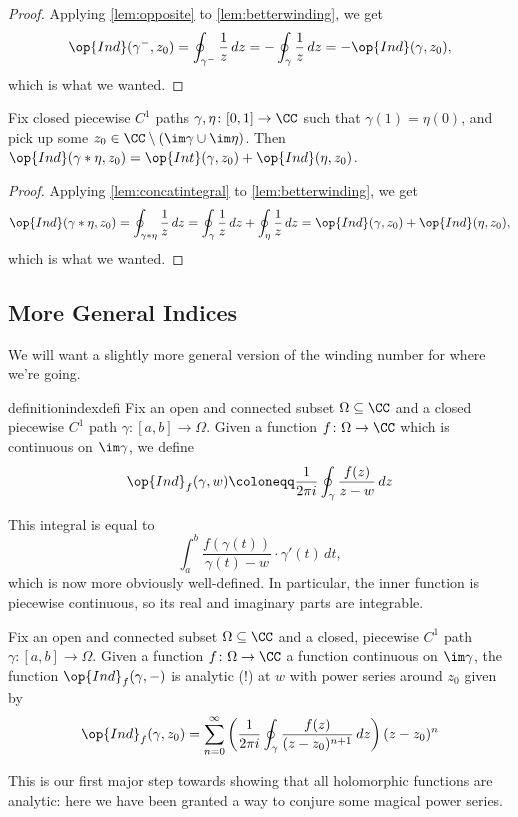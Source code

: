 \documentclass[../notes.tex]{subfiles}
\begin{document}
\begin{proof}
	Applying \autoref{lem:opposite} to \autoref{lem:betterwinding}, we get
	\[\op{Ind}(\gamma^-,z_0)=\oint_{\gamma^-}\frac1z\,dz=-\oint_\gamma\frac1z\,dz=-\op{Ind}(\gamma,z_0),\]
	which is what we wanted.
\end{proof}
\begin{corollary}
	Fix closed piecewise $C^1$ paths $\gamma,\eta\colon [0,1]\to\CC$ such that $\gamma(1)=\eta(0)$, and pick up some $z_0\in\CC\setminus(\im\gamma\cup\im\eta)$. Then $\op{Ind}(\gamma*\eta,z_0)=\op{Int}(\gamma,z_0)+\op{Ind}(\eta,z_0)$.
\end{corollary}
\begin{proof}
	Applying \autoref{lem:concatintegral} to \autoref{lem:betterwinding}, we get
	\[\op{Ind}(\gamma*\eta,z_0)=\oint_{\gamma*\eta}\frac1z\,dz=\oint_\gamma\frac1z\,dz+\oint_\eta\frac1z\,dz=\op{Ind}(\gamma,z_0)+\op{Ind}(\eta,z_0),\]
	which is what we wanted.
\end{proof}

\subsection{More General Indices}
We will want a slightly more general version of the winding number for where we're going.
\begin{restatable}[Index]{definition}{indexdefi}
	Fix an open and connected subset $\Omega\subseteq\CC$ and a closed piecewise $C^1$ path $\gamma\colon [a,b]\to\Omega$. Given a function $f\colon \Omega\to\CC$ which is continuous on $\im\gamma$, we define
	\[\op{Ind}_f(\gamma,w)\coloneqq \frac1{2\pi i}\oint_\gamma\frac{f(z)}{z-w}\,dz\]
\end{restatable}
\begin{remark}
	This integral is equal to
	\[\int_a^b\frac{f(\gamma(t))}{\gamma(t)-w}\cdot\gamma'(t)\,dt,\]
	which is now more obviously well-defined. In particular, the inner function is piecewise continuous, so its real and imaginary parts are integrable.
\end{remark}
\begin{proposition} \label{prop:indexanalytic}
	Fix an open and connected subset $\Omega\subseteq\CC$ and a closed, piecewise $C^1$ path $\gamma\colon [a,b]\to\Omega$. Given a function $f\colon \Omega\to\CC$ a function continuous on $\im\gamma$, the function $\op{Ind}_f(\gamma,-)$ is analytic (!) at $w$ with power series around $z_0$ given by
	\[\op{Ind}_f(\gamma,z_0)=\sum_{n=0}^\infty\left(\frac1{2\pi i}\oint_\gamma\frac{f(z)}{(z-z_0)^{n+1}}\,dz\right)(z-z_0)^n\]
\end{proposition}
This is our first major step towards showing that all holomorphic functions are analytic: here we have been granted a way to conjure some magical power series.
\end{document}
